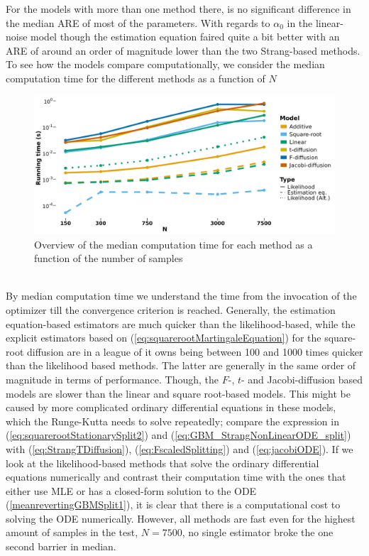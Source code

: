 For the models with more than one method there, is no significant difference in the median ARE of most of the parameters. With regards to $\alpha_0$ in the linear-noise model though the estimation equation faired quite a bit better with an ARE of around an order of magnitude lower than the two Strang-based methods. To see how the models compare computationally, we consider the median computation time for the different methods as a function of $N$
\begin{figure}[h]
    \begin{center}
    \includegraphics[scale = .1]{figures/estimation_duration_stationary.jpeg}
    \caption{Overview of the median computation time for each method as a function of the number of samples}
    \label{figure:overviewOfDurationStationary}
    \end{center}
\end{figure}\\
By median computation time we understand the time from the invocation of the optimizer till the convergence criterion is reached. Generally, the estimation equation-based estimators are much quicker than the likelihood-based, while the explicit estimators based on (\ref{eq:squarerootMartingaleEquation}) for the square-root diffusion are in a league of it owns being between 100 and 1000 times quicker than the likelihood based methods. The latter are generally in the same order of magnitude in terms of performance. Though, the $F$-, $t$- and Jacobi-diffusion based models are slower than the linear and square root-based models. This might be caused by more complicated ordinary differential equations in these models, which the Runge-Kutta needs to solve repeatedly; compare the expression in (\ref{eq:squarerootStationarySplit2}) and (\ref{eq:GBM_StrangNonLinearODE_split}) with (\ref{eq:StrangTDiffusion}), (\ref{eq:FscaledSplitting}) and (\ref{eq:jacobiODE}). If we look at the likelihood-based methods that solve the ordinary differential equations numerically and contrast their computation time with the ones that either use MLE or has a closed-form solution to the ODE (\ref{meanrevertingGBMSplit1}), it is clear that there is a computational cost to solving the ODE numerically. However, all methods are fast even for the highest amount of samples in the test, $N = 7500$, no single estimator broke the one second barrier in median.
